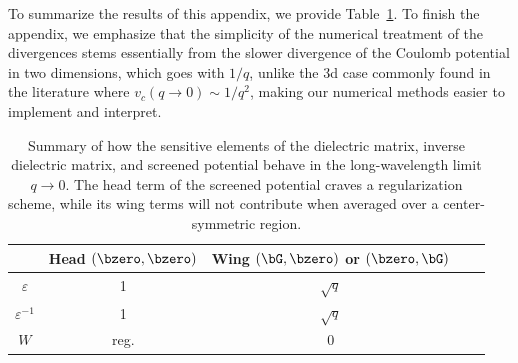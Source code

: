 To summarize the results of this appendix, we provide Table~\ref{tab:epsilon_long_wavelength_summary}.
To finish the appendix, we emphasize that the simplicity of the numerical treatment of the divergences stems essentially from the slower divergence of the Coulomb potential in two dimensions, which goes with $1/q$, unlike the \gls{3d} case commonly found in the literature where $v_c(q \to 0) \sim 1/q^2$, making our numerical methods easier to implement and interpret.

\begin{table}[h]
\centering
\caption{Summary of how the sensitive elements of the dielectric matrix, inverse dielectric matrix, and screened potential behave in the long-wavelength limit $q \to 0$.
The head term of the screened potential craves a regularization scheme, while its wing terms will not contribute when averaged over a center-symmetric region.}
\begin{tabular}{ccccc}
\toprule
                   & Head $(\bzero,\bzero)$    &      Wing  $(\bG,\bzero)$ or $(\bzero,\bG)$    \\ \hline
$\varepsilon$      &    1     &   $\sqrt{q}$   \\ \hline
$\varepsilon^{-1}$ &    1     &   $\sqrt{q} $  \\ \hline
$W$                &   reg.   &        0       \\ \bottomrule
\end{tabular}
\label{tab:epsilon_long_wavelength_summary}
\end{table}